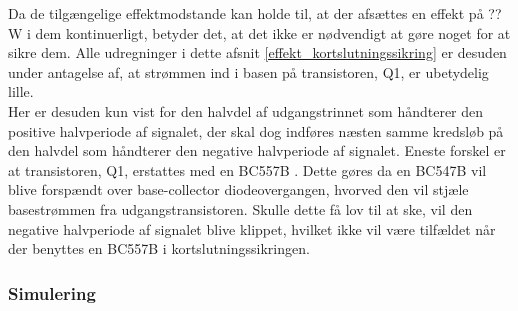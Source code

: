 Da de tilgængelige effektmodstande kan holde til, at der afsættes en effekt på ?? W i dem kontinuerligt, betyder det, at det ikke er nødvendigt at gøre noget for at sikre dem. Alle udregninger i dette afsnit \ref{effekt_kortslutningssikring} er desuden under antagelse af, at strømmen ind i basen på transistoren, Q1, er ubetydelig lille.\\
Her er desuden kun vist for den halvdel af udgangstrinnet som håndterer den positive halvperiode af signalet, der skal dog indføres næsten samme kredsløb på den halvdel som håndterer den negative halvperiode af signalet. Eneste forskel er at transistoren, Q1, erstattes med en BC557B \cite{bc557b-datablad}. Dette gøres da en BC547B vil blive forspændt over base-collector diodeovergangen, hvorved den vil stjæle basestrømmen fra udgangstransistoren. Skulle dette få lov til at ske, vil den negative halvperiode af signalet blive klippet, hvilket ikke vil være tilfældet når der benyttes en BC557B i kortslutningssikringen. 

\subsubsection*{Simulering}